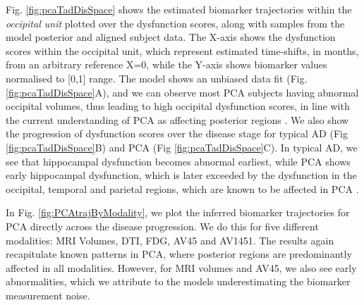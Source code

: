\documentclass{llncs}
\begin{document}
Fig. \ref{fig:pcaTadDisSpace} shows the estimated biomarker trajectories within the \emph{occipital unit} plotted over the dysfunction scores, along with samples from the model posterior and aligned subject data. The X-axis shows the dysfunction scores within the occipital unit, which represent estimated time-shifts, in months, from an arbitrary reference X=0, while the Y-axis shows biomarker values normalised to [0,1] range. The model shows an unbiased data fit (Fig. \ref{fig:pcaTadDisSpace}A), and we can observe most PCA subjects having abnormal occipital volumes, thus leading to high occipital dysfunction scores, in line with the current understanding of PCA as affecting posterior regions \cite{crutch2012posterior}. We also show the progression of dysfunction scores over the disease stage for typical AD (Fig \ref{fig:pcaTadDisSpace}B) and PCA (Fig \ref{fig:pcaTadDisSpace}C). In typical AD, we see that hippocampal dysfunction becomes abnormal earliest, while PCA shows early hippocampal dysfunction, which is later exceeded by the dysfunction in the occipital, temporal and parietal regions, which are known to be affected in PCA \cite{crutch2012posterior}. 

In Fig. \ref{fig:PCAtrajByModality}, we plot the inferred biomarker trajectories for PCA directly across the disease progression. We do this for five different modalities: MRI Volumes, DTI, FDG, AV45 and AV1451. The results again recapitulate known patterns in PCA, where posterior regions are predominantly affected in all modalities. However, for MRI volumes and AV45, we also see early abnormalities, which we attribute to the models underestimating the biomarker measurement noise.
\end{document}
